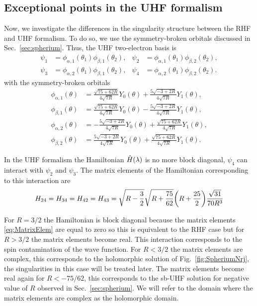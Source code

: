 \documentclass[11pt,a4paper]{article}
\newcommand{\hH}{\Hat{H}}
\begin{document}
\subsection{Exceptional points in the UHF formalism}\label{sec:uhfSing}

Now, we investigate the differences in the singularity structure between the RHF and UHF formalism. To do so, we use the symmetry-broken orbitals discussed in Sec.~\ref{sec:spherium}. Thus, the UHF two-electron basis is
\begin{align}\label{eq:uhfbasis}
 \psi_1 & =\phi_{\alpha,1}(\theta_1)\phi_{\beta,1}(\theta_2),
 & 
 \psi_2 & =\phi_{\alpha,1}(\theta_1)\phi_{\beta,2}(\theta_2),\\
 \psi_3 & =\phi_{\alpha,2}(\theta_1)\phi_{\beta,1}(\theta_2),
 & 
 \psi_4 & =\phi_{\alpha,2}(\theta_1)\phi_{\beta,2}(\theta_2).
\end{align}
with the symmetry-broken orbitals
\begin{subequations}
\begin{align}\label{eq:uhforbitals}
 	\phi_{\alpha,1}(\theta) 
 		& =\frac{\sqrt{75+62R}}{4\sqrt{7R}} Y_{0}(\theta)
 		+ \frac{5\sqrt{-3+2R}}{4\sqrt{7R}} Y_{1}(\theta),
 \\ 
 	\phi_{\beta,1}(\theta) 
		& =\frac{\sqrt{75+62R}}{4\sqrt{7R}} Y_{0}(\theta)
		- \frac{5\sqrt{-3+2R}}{4\sqrt{7R}} Y_{1}(\theta),
 \\
	 \phi_{\alpha,2}(\theta) 
	 & = - \frac{5\sqrt{-3+2R}}{4\sqrt{7R}} Y_{0}(\theta)
	  + \frac{\sqrt{75+62R}}{4\sqrt{7R}} Y_{1}(\theta),
 \\
	 \phi_{\beta,2}(\theta) 
	 & =\frac{5\sqrt{-3+2R}}{4\sqrt{7R}} Y_{0}(\theta)
	 +\frac{\sqrt{75+62R}}{4\sqrt{7R}} Y_{1}(\theta).
\end{align}
\end{subequations}

In the UHF formalism the Hamiltonian $\hH(\lambda)$ is no more block diagonal, $\psi_4$ can interact with $\psi_2$ and $\psi_3$. The matrix elements of the Hamiltonian corresponding to this interaction are
\begin{equation}\label{eq:MatrixElem}
	H_{24}=H_{34}=H_{42}=H_{43}=\sqrt{R-\frac{3}{2}}\sqrt{R+\frac{75}{62}}\qty(R+\frac{25}{2})\frac{\sqrt{31}}{70R^3}
\end{equation}

For $R=3/2$ the Hamiltonian is block diagonal because the matrix elements \eqref{eq:MatrixElem} are equal to zero so this is equivalent to the RHF case but for $R>3/2$ the matrix elements become real. This interaction corresponds to the spin contamination of the wave function. For $R<3/2$ the matrix elements are complex, this corresponds to the holomorphic solution of Fig.~\ref{fig:SpheriumNrj}, the singularities in this case will be treated later. The matrix elements become real again for $R<-75/62$, this corresponds to the sb-UHF solution for negative value of $R$ observed in Sec.~\ref{sec:spherium}. We will refer to the domain where the matrix elements are complex as the holomorphic domain.
\end{document}
